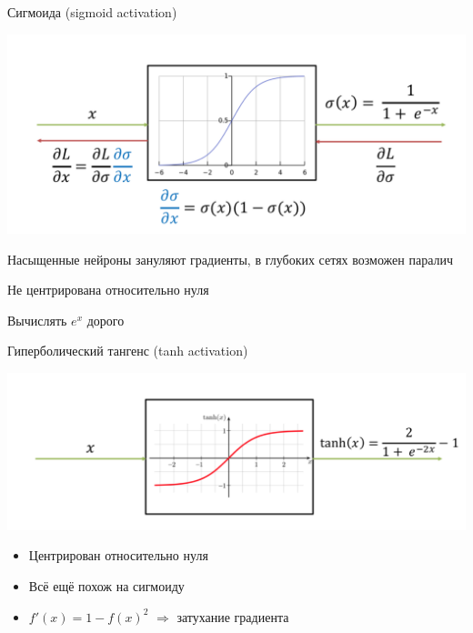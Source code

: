 \documentclass[notes,12pt, aspectratio=169]{beamer}
\begin{document}
\begin{frame}{Сигмоида (sigmoid activation)}
\begin{center}
	\includegraphics[width=.65\linewidth]{sigmoid_activation_2.png}
\end{center}

\begin{itemize}
	{\color{red} 
		\item Насыщенные нейроны зануляют градиенты, в глубоких сетях возможен паралич
		\item Не центрирована относительно нуля
		\item Вычислять $e^x$ дорого
	}
\end{itemize}
\end{frame}


\begin{frame}{Гиперболический тангенс (tanh activation)}
	\begin{center}
		\includegraphics[width=.8\linewidth]{tanh_activation.png}
	\end{center}
	\begin{itemize}
		\item  {\color{green}  Центрирован относительно нуля }
		
		\item  {\color{red}  Всё ещё похож на сигмоиду }
		
		\item $f'(x) = 1 - f(x)^2$  $\Rightarrow$ затухание градиента
	\end{itemize}
\end{frame}
\end{document}
